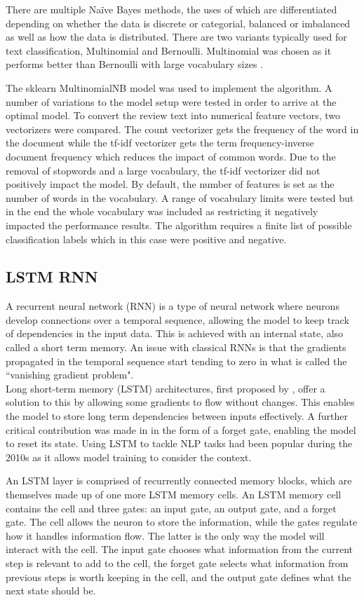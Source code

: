 \documentclass{svproc}
\begin{document}
There are multiple Na\"ive Bayes methods, the uses of which are differentiated depending on whether the data is discrete or categorial, balanced or imbalanced as well as how the data is distributed. There are two variants typically used for text classification, Multinomial and Bernoulli. Multinomial was chosen as it performs better than Bernoulli with large vocabulary sizes \cite{mbn_vs_bnb}.

The sklearn MultinomialNB model was used to implement the algorithm. A number of variations to the model setup were tested in order to arrive at the optimal model. To convert the review text into numerical feature vectors, two vectorizers were compared. The count vectorizer gets the frequency of the word in the document while the tf-idf vectorizer gets the term frequency-inverse document frequency which reduces the impact of common words. Due to the removal of stopwords and a large vocabulary, the tf-idf vectorizer did not positively impact the model. By default, the number of features is set as the number of words in the vocabulary. A range of vocabulary limits were tested but in the end the whole vocabulary was included as restricting it negatively impacted the performance results. The algorithm requires a finite list of possible classification labels which in this case were positive and negative.


\subsection{LSTM RNN}
A recurrent neural network (RNN) is a type of neural network where neurons develop connections over a temporal sequence, allowing the model to keep track of dependencies in the input data. This is achieved with an internal state, also called a short term memory. An issue with classical RNNs is that the gradients propagated in the temporal sequence start tending to zero in what is called the ``vanishing gradient problem". \\
Long short-term memory (LSTM) architectures, first proposed by \cite{Hochreiter1997}, offer a solution to this by allowing some gradients to flow without changes. This enables the model to store long term dependencies between inputs effectively. A further critical contribution was made in \cite{gers1999learning} in the form of a forget gate, enabling the model to reset its state.
Using LSTM to tackle NLP tasks had been popular during the 2010s as it allows model training to consider the context.

An LSTM layer is comprised of recurrently connected memory blocks, which are themselves made up of one more LSTM memory cells. An LSTM memory cell contains the cell and three gates: an input gate, an output gate, and a forget gate. The cell allows the neuron to store the information, while the gates regulate how it handles information flow. The latter is the only way the model will interact with the cell. The input gate chooses what information from the current step is relevant to add to the cell, the forget gate selects what information from previous steps is worth keeping in the cell, and the output gate defines what the next state should be.
\end{document}
